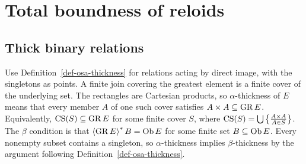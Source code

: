 
\chapter{Total boundness of reloids}


\section{Thick binary relations}
Use Definition~\ref{def-osa-thickness} for relations acting by
direct image, with the singletons as points. A finite join covering
the greatest element is a finite cover of the underlying set.
The rectangles are Cartesian products, so $\alpha$-thickness of
$E$ means that every member $A$ of one such cover satisfies
$A\times A\subseteq\operatorname{GR} E$. Equivalently,
$\operatorname{CS}(S)\subseteq\operatorname{GR} E$ for some finite cover $S$, where
$\operatorname{CS}(S)=\bigcup\left\{ \frac{A\times A}{A\in S}\right\}$.
The $\beta$ condition is that $\left\langle \operatorname{GR} E\right\rangle ^{\ast}B=\operatorname{Ob} E$ for some
finite set $B\subseteq\operatorname{Ob} E$. Every nonempty subset contains a
singleton, so $\alpha$-thickness implies $\beta$-thickness by the
argument following Definition~\ref{def-osa-thickness}.

